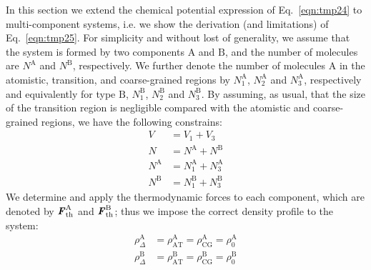 \documentclass[a4paper,preprint,unsortedaddress]{revtex4-1}
\newcommand{\recheck}[1]{{\color{red} #1}}
\newcommand{\vect}[1]{\textbf{\textit{#1}}}
\newcommand{\AT}{{\textrm{{AT}}}}
\newcommand{\CG}{{\textrm{CG}}}
\newcommand{\HY}{{\Delta}}
\newcommand{\thf}{{\textrm{th}}}
\newcommand{\typea}{{\textrm{A}}}
\newcommand{\typeb}{{\textrm{B}}}
\begin{document}
\recheck{In this section we  extend the chemical potential
expression of Eq.~\eqref{eqn:tmp24} to multi-component
systems, i.e. we show the derivation (and limitations) of Eq.~\eqref{eqn:tmp25}.
For simplicity and without lost of generality, we assume that the system
is formed by two components $\typea$ and $\typeb$, and the number of molecules are
$N^\typea$ and $N^\typeb$, respectively.  We further denote the number of 
molecules $\typea$ in the atomistic, transition, and coarse-grained regions by
$N^\typea_1$, $N^\typea_2$ and $N^\typea_3$, respectively and equivalently for type $\typeb$, $N^\typeb_1$, $N^\typeb_2$ and $N^\typeb_3$.  By
assuming, as usual, that the size of the transition region is negligible compared with the
atomistic and coarse-grained regions, we have the following
constrains:
\begin{align}
  V &= V_1 + V_3\\
  N &= N^\typea + N^\typeb\\
  N^\typea &= N^\typea_1 + N^\typea_3\\
  N^\typeb &= N^\typeb_1 + N^\typeb_3
\end{align}
We determine and apply the thermodynamic forces to each component, which
are denoted by $\vect F^\typea_\thf$ and $\vect F^\typeb_\thf$; thus we  impose the correct density profile to the system:
\begin{align}
  \rho_\HY^\typea &= \rho_\AT^\typea = \rho_\CG^\typea = \rho_0^\typea\\
  \rho_\HY^\typeb &= \rho_\AT^\typeb = \rho_\CG^\typeb = \rho_0^\typeb
\end{align}

}
\end{document}
